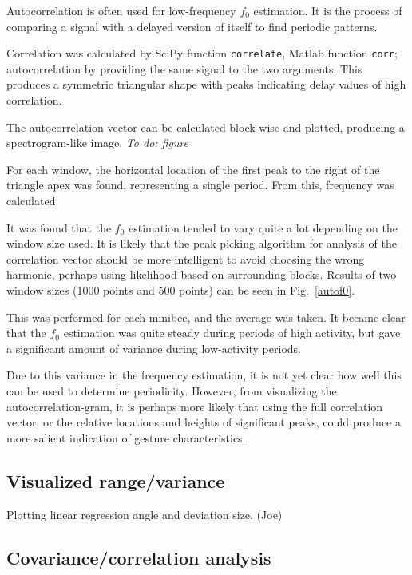 \documentclass{article}
\newcommand{\todo}[1]{\emph{To do: #1}}
\newcommand{\func}[1]{\texttt{#1}}
\begin{document}
Autocorrelation is often used for low-frequency $f_0$ estimation.
It is the process of comparing a signal with a delayed version of
itself to find periodic patterns.

Correlation was calculated by SciPy function \func{correlate}, Matlab
function \func{corr}; autocorrelation by providing the same signal to
the two arguments.
This produces a symmetric triangular shape with peaks indicating delay
values of high correlation.

The autocorrelation vector can be calculated block-wise and plotted,
producing a spectrogram-like image. \todo{figure}

For each window, the horizontal location of the first peak to the
right of the triangle apex was found, representing a single period.
From this, frequency was calculated.

It was found that the $f_0$ estimation tended to vary quite a lot
depending on the window size used.
It is likely that the peak picking algorithm for analysis of the
correlation vector should be more intelligent to avoid choosing the
wrong harmonic, perhaps using likelihood based on surrounding blocks.
Results of two window sizes (1000 points and 500 points) can be seen
in Fig.~\ref{autof0}.

This was performed for each minibee, and the average was taken.  It
became clear that the $f_0$ estimation was quite steady during periods
of high activity, but gave a significant amount of variance during
low-activity periods.

Due to this variance in the frequency estimation, it is not yet clear
how well this can be used to determine periodicity.  However, from
visualizing the autocorrelation-gram, it is perhaps more likely that
using the full correlation vector, or the relative locations and
heights of significant peaks, could produce a more salient indication
of gesture characteristics.

\subsection{Visualized range/variance}

Plotting linear regression angle and deviation size. (Joe)

\subsection{Covariance/correlation analysis}
\end{document}
